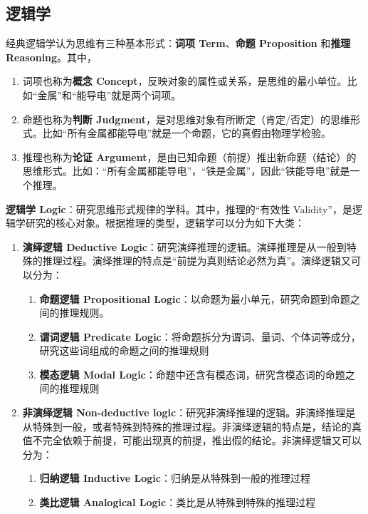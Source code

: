 \subsection{逻辑学}
\label{subsection:logic}

经典逻辑学认为思维有三种基本形式：\textbf{词项 Term}、\textbf{命题 Proposition} 和\textbf{推理 Reasoning}。其中，
\begin{enumerate}
    \item 词项也称为\textbf{概念 Concept}，反映对象的属性或关系，是思维的最小单位。比如“金属”和“能导电”就是两个词项。
    \item 命题也称为\textbf{判断 Judgment}，是对思维对象有所断定（肯定/否定）的思维形式。比如“所有金属都能导电”就是一个命题，它的真假由物理学检验。
    \item 推理也称为\textbf{论证 Argument}，是由已知命题（前提）推出新命题（结论）的思维形式。比如：“所有金属都能导电”，“铁是金属”，因此“铁能导电”就是一个推理。
\end{enumerate}

\vspace{1em}
\textbf{逻辑学 Logic}：研究思维形式规律的学科。其中，推理的“有效性 Validity”，是逻辑学研究的核心对象。根据推理的类型，逻辑学可以分为如下大类：
\begin{enumerate}
    \item \textbf{演绎逻辑 Deductive Logic}：研究演绎推理的逻辑。演绎推理是从一般到特殊的推理过程。演绎推理的特点是“前提为真则结论必然为真”。演绎逻辑又可以分为：
    \begin{enumerate}
        \item \textbf{命题逻辑 Propositional Logic}：以命题为最小单元，研究命题到命题之间的推理规则。
        \item \textbf{谓词逻辑 Predicate Logic}：将命题拆分为谓词、量词、个体词等成分，研究这些词组成的命题之间的推理规则
        \item \textbf{模态逻辑 Modal Logic}：命题中还含有模态词，研究含模态词的命题之间的推理规则
    \end{enumerate}
    \item \textbf{非演绎逻辑 Non-deductive logic}：研究非演绎推理的逻辑。非演绎推理是从特殊到一般，或者特殊到特殊的推理过程。非演绎逻辑的特点是，结论的真值不完全依赖于前提，可能出现真的前提，推出假的结论。非演绎逻辑又可以分为：
    \begin{enumerate}
        \item \textbf{归纳逻辑 Inductive Logic}：归纳是从特殊到一般的推理过程
        \item \textbf{类比逻辑 Analogical Logic}：类比是从特殊到特殊的推理过程
    \end{enumerate}
\end{enumerate}

